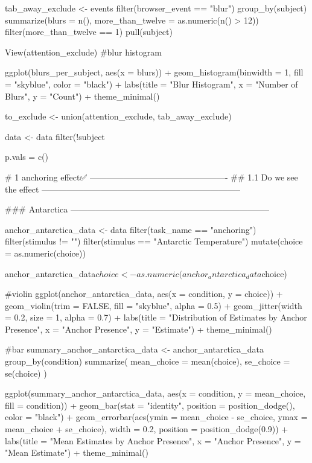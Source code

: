 \documentclass{article}
\begin{document}
  tab_away_exclude <- events %
    filter(browser_event == "blur") %
    group_by(subject) %
    summarize(blurs = n(), more_than_twelve = as.numeric(n() > 12))%
    filter(more_than_twelve == 1) %
    pull(subject)
  
  View(attention_exclude)
  #blur histogram
  
  ggplot(blurs_per_subject, aes(x = blurs)) +
    geom_histogram(binwidth = 1, fill = "skyblue", color = "black") +
    labs(title = "Blur Histogram", x = "Number of Blurs", y = "Count") +
    theme_minimal()
  
  to_exclude <- union(attention_exclude, tab_away_exclude)
  
  data <- data %
    filter(!subject %
  
  

p.vals = c()

# 1 anchoring effect✅  -------------------------------------------------
    ## 1.1 Do we see the effect -----------------------------------------------------------------------


    ### Antarctica -----------------------------------------------------------------------


anchor_antarctica_data <- data %
  filter(task_name == "anchoring") %
  filter(stimulus != "")%
  filter(stimulus == "Antarctic Temperature") %
  mutate(choice = as.numeric(choice))
  
anchor_antarctica_data$choice <- as.numeric(anchor_antarctica_data$choice)


#violin
ggplot(anchor_antarctica_data, aes(x = condition, y = choice)) +
  geom_violin(trim = FALSE, fill = "skyblue", alpha = 0.5) +
  geom_jitter(width = 0.2, size = 1, alpha = 0.7) +
  labs(title = "Distribution of Estimates by Anchor Presence", x = "Anchor Presence", y = "Estimate") +
  theme_minimal()

#bar
summary_anchor_antarctica_data <- anchor_antarctica_data %
  group_by(condition) %
  summarize(
    mean_choice = mean(choice),
    se_choice = se(choice)
  )


ggplot(summary_anchor_antarctica_data, aes(x = condition, y = mean_choice, fill = condition)) +
  geom_bar(stat = "identity", position = position_dodge(), color = "black") +
  geom_errorbar(aes(ymin = mean_choice - se_choice, ymax = mean_choice + se_choice), width = 0.2, position = position_dodge(0.9)) +
  labs(title = "Mean Estimates by Anchor Presence", x = "Anchor Presence", y = "Mean Estimate") +
  theme_minimal()
\end{document}
